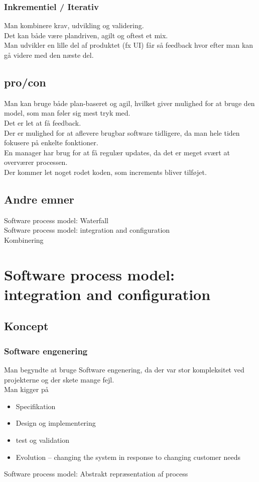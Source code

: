 \documentclass[11pt,a4paper]{article}
\begin{document}
\subsubsection*{Inkrementiel / Iterativ}
Man kombinere krav, udvikling og validering.\\
Det kan både være plandriven, agilt og oftest et mix.\\
Man udvikler en lille del af produktet (fx UI) får så feedback hvor efter man kan gå videre med den næste del.
\subsection*{pro/con}
Man kan bruge både plan-baseret og agil, hvilket giver mulighed for at bruge den model, som man føler sig mest tryk med.\\
Det er let at få feedback.\\
Der er mulighed for at aflevere brugbar software tidligere, da man hele tiden fokusere på enkelte fonktioner.\\
En manager har brug for at få regulær updates, da det er meget svært at overværer processen.\\
Der kommer let noget rodet koden, som increments bliver tilføjet.

\subsection*{Andre emner}
Software process model: Waterfall\\
Software process model: integration and configuration\\
Kombinering
\newpage

\section{Software process model: integration and configuration}
\subsection*{Koncept}
\subsubsection*{Software engenering}
Man begyndte at bruge Software engenering, da der var stor kompleksitet ved projekterne og der skete mange fejl.\\
Man kigger på 
\begin{itemize}
\item Specifikation
\item Design og implementering
\item test og validation
\item Evolution – changing the system in response to changing customer needs
\end{itemize}
Software process model: Abstrakt repræsentation af process
\end{document}
